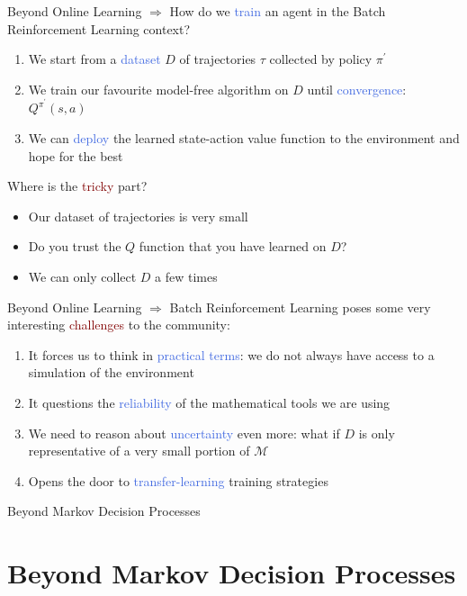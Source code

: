\documentclass{beamer}
\newcommand{\xmark}{\ding{55}}
\begin{document}
\begin{frame}{Beyond Online Learning}
	$\Rightarrow$ How do we \textcolor{RoyalBlue}{train} an agent in the Batch Reinforcement Learning context?
	
	\begin{enumerate}
		\item We start from a \textcolor{RoyalBlue}{dataset} $D$ of trajectories $\tau$ collected by policy $\pi^{\prime}$
		\item We train our favourite model-free algorithm on $D$ until \textcolor{RoyalBlue}{convergence}: $Q^{\pi^{\prime}}(s,a)$
		\item We can \textcolor{RoyalBlue}{deploy} the learned state-action value function to the environment and hope for the best
	\end{enumerate}

	\bigskip

	Where is the \textcolor{Maroon}{tricky} part?
	\begin{itemize}
		\item Our dataset of trajectories is very small \textcolor{red}{\xmark}
		\item Do you trust the $Q$ function that you have learned on $D$? \textcolor{red}{\xmark}
		\item We can only collect $D$ a few times \textcolor{red}{\xmark}
	\end{itemize}

\end{frame}

\begin{frame}{Beyond Online Learning}
	$\Rightarrow$ Batch Reinforcement Learning  poses some very interesting \textcolor{Maroon}{challenges} to the community:
	\begin{enumerate}
		\item It forces us to think in \textcolor{RoyalBlue}{practical terms}: we do not always have access to a simulation of the environment
		\item It questions the \textcolor{RoyalBlue}{reliability} of the mathematical tools we are using
		\item We need to reason about \textcolor{RoyalBlue}{uncertainty} even more: what if $D$ is only representative of a very small portion of $\mathcal{M}$
		\item Opens the door to \textcolor{RoyalBlue}{transfer-learning} training strategies
	\end{enumerate}

\end{frame}

\begin{frame}{Beyond Markov Decision Processes}
	\section{Beyond Markov Decision Processes}
\end{frame}


\end{document}
